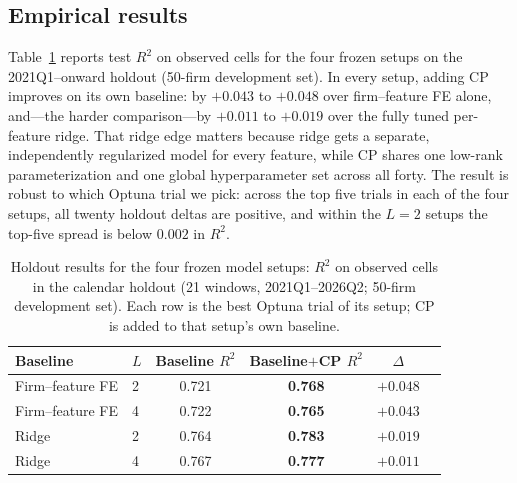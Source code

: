 \documentclass[pdflatex,sn-mathphys-num]{sn-jnl}%
\theoremstyle{thmstyleone}%
\theoremstyle{thmstyletwo}%
\theoremstyle{thmstylethree}%
\begin{document}
\subsection{Empirical results}
\label{Section:Predictive_Results}

Table~\ref{Tab:CP_Ridge_Results} reports test $R^2$ on observed cells for the four frozen setups on the 2021Q1--onward holdout (50-firm development set). In every setup, adding CP improves on its own baseline: by $+0.043$ to $+0.048$ over firm--feature FE alone, and---the harder comparison---by $+0.011$ to $+0.019$ over the fully tuned per-feature ridge. That ridge edge matters because ridge gets a separate, independently regularized model for every feature, while CP shares one low-rank parameterization and one global hyperparameter set across all forty. The result is robust to which Optuna trial we pick: across the top five trials in each of the four setups, all twenty holdout deltas are positive, and within the $L=2$ setups the top-five spread is below $0.002$ in $R^2$.

\begin{table}[!htbp]
\centering
\caption{Holdout results for the four frozen model setups: $R^2$ on observed cells in the calendar holdout (21 windows, 2021Q1--2026Q2; 50-firm development set). Each row is the best Optuna trial of its setup; CP is added to that setup's own baseline.}
\label{Tab:CP_Ridge_Results}
\begin{tabular}{llcccc}
\toprule
Baseline & $L$ & Baseline $R^2$ & Baseline$+$CP $R^2$ & $\Delta$ \\
\midrule
Firm--feature FE & 2 & 0.721 & \textbf{0.768} & $+0.048$ \\
Firm--feature FE & 4 & 0.722 & \textbf{0.765} & $+0.043$ \\
Ridge              & 2 & 0.764 & \textbf{0.783} & $+0.019$ \\
Ridge              & 4 & 0.767 & \textbf{0.777} & $+0.011$ \\
\bottomrule
\end{tabular}
\end{table}
\end{document}
